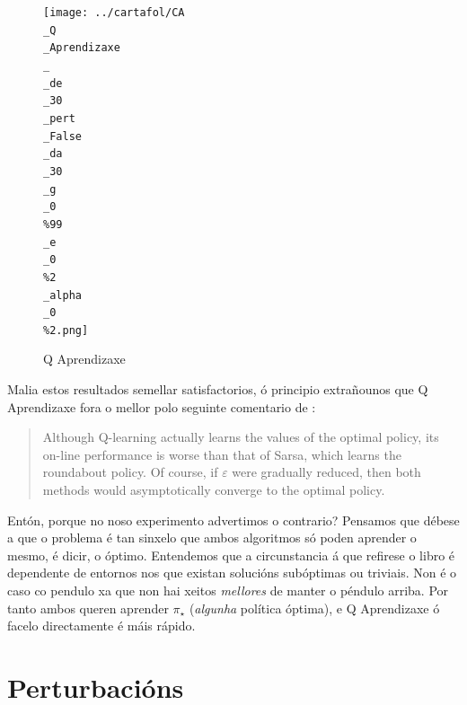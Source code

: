 \documentclass{article}
\begin{document}
\begin{figure}[htbp]
\begin{minipage}{0.45\textwidth}
    \end{minipage}
    \hfill
    \begin{minipage}{0.45\textwidth}
        \centering
	\texttt{[image: ../cartafol/CA\\\_Q\\\_Aprendizaxe\\\_\\\_de\\\_30\\\_pert\\\_False\\\_da\\\_30\\\_g\\\_0\\\%99\\\_e\\\_0\\\%2\\\_alpha\\\_0\\\%2.png]}
\caption*{Q Aprendizaxe}

    \end{minipage}
\end{figure}

\newpage

Malia estos resultados semellar satisfactorios, ó principio extrañounos que Q Aprendizaxe fora o mellor polo seguinte comentario de \cite{Sutton1998}:

\begin{quote}
Although Q-learning actually learns the values of the optimal policy, its on-line performance is worse than that of Sarsa, which learns the roundabout policy. Of course, if $\varepsilon$ were gradually reduced, then both methods would asymptotically converge to the optimal policy.
\end{quote}

Entón, porque no noso experimento advertimos o contrario? Pensamos que débese a que o problema é tan sinxelo que ambos algoritmos só poden aprender o mesmo, é dicir, o óptimo. Entendemos que a circunstancia á que refirese o libro é dependente de entornos nos que existan solucións subóptimas ou triviais. Non é o caso co pendulo xa que non hai xeitos \emph{mellores} de manter o péndulo arriba. Por tanto ambos queren aprender $\pi_{\star}$ (\emph{algunha} política óptima), e Q Aprendizaxe ó facelo directamente é máis rápido.

\section{Perturbacións}
\end{document}
